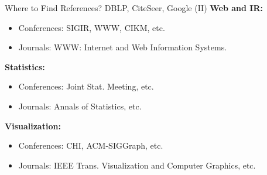\begin{frame}{Where to Find References? DBLP, CiteSeer, Google (II)}
	\textbf{Web and IR:}
	\begin{itemize}
		\item Conferences: SIGIR, WWW, CIKM, etc.
		\item Journals: WWW: Internet and Web Information Systems.
	\end{itemize}
	\textbf{Statistics:}
	\begin{itemize}
		\item Conferences: Joint Stat. Meeting, etc.
		\item Journals: Annals of Statistics, etc.
	\end{itemize}
	\textbf{Visualization:}
	\begin{itemize}
		\item Conferences: CHI, ACM-SIGGraph, etc.
		\item Journals: IEEE Trans. Visualization and Computer Graphics, etc.
	\end{itemize}
\end{frame}